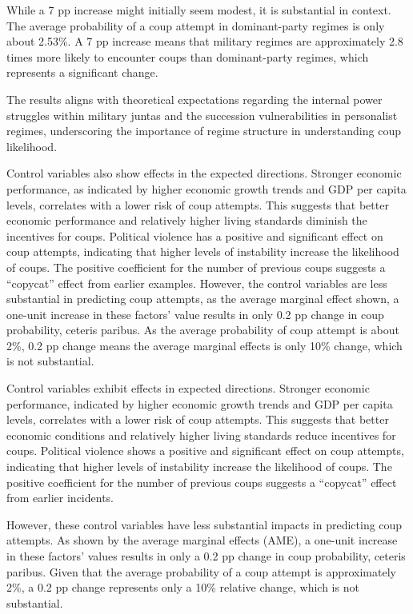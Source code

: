 \documentclass[
  12pt,
]{report}
\begin{document}
While a 7 pp increase might initially seem modest, it is substantial in
context. The average probability of a coup attempt in dominant-party
regimes is only about 2.53\%. A 7 pp increase means that military
regimes are approximately 2.8 times more likely to encounter coups than
dominant-party regimes, which represents a significant change.

The results aligns with theoretical expectations regarding the internal
power struggles within military juntas and the succession
vulnerabilities in personalist regimes, underscoring the importance of
regime structure in understanding coup likelihood.

Control variables also show effects in the expected directions. Stronger
economic performance, as indicated by higher economic growth trends and
GDP per capita levels, correlates with a lower risk of coup attempts.
This suggests that better economic performance and relatively higher
living standards diminish the incentives for coups. Political violence
has a positive and significant effect on coup attempts, indicating that
higher levels of instability increase the likelihood of coups. The
positive coefficient for the number of previous coups suggests a
``copycat'' effect from earlier examples. However, the control variables
are less substantial in predicting coup attempts, as the average
marginal effect shown, a one-unit increase in these factors' value
results in only 0.2 pp change in coup probability, ceteris paribus. As
the average probability of coup attempt is about 2\%, 0.2 pp change
means the average marginal effects is only 10\% change, which is not
substantial.

Control variables exhibit effects in expected directions. Stronger
economic performance, indicated by higher economic growth trends and GDP
per capita levels, correlates with a lower risk of coup attempts. This
suggests that better economic conditions and relatively higher living
standards reduce incentives for coups. Political violence shows a
positive and significant effect on coup attempts, indicating that higher
levels of instability increase the likelihood of coups. The positive
coefficient for the number of previous coups suggests a ``copycat''
effect from earlier incidents.

However, these control variables have less substantial impacts in
predicting coup attempts. As shown by the average marginal effects
(AME), a one-unit increase in these factors' values results in only a
0.2 pp change in coup probability, ceteris paribus. Given that the
average probability of a coup attempt is approximately 2\%, a 0.2 pp
change represents only a 10\% relative change, which is not substantial.
\end{document}
